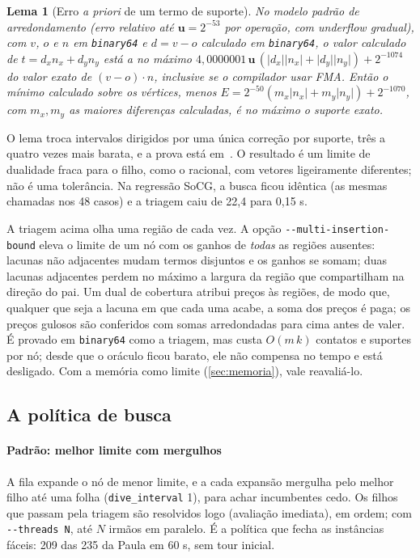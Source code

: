 \documentclass[11pt,a4paper]{article}
\theoremstyle{plain}\newtheorem{proposicao}{Proposição}
\theoremstyle{definition}\newtheorem{definicao}{Definição}
\theoremstyle{plain}\newtheorem{teorema}{Teorema}
\theoremstyle{plain}\newtheorem{lema}{Lema}
\newcommand{\abs}[1]{\lvert#1\rvert}
\newcommand{\code}[1]{\texttt{\small #1}}
\begin{document}
\begin{lema}[Erro \emph{a priori} de um termo de suporte]\label{lem:apriori}
No modelo padrão de arredondamento (erro relativo até \(\mathbf u=2^{-53}\) por operação, com \emph{underflow} gradual), com \(v\), \(o\) e \(n\) em \texttt{binary64} e \(d=v-o\) calculado em \texttt{binary64}, o valor calculado de \(t=d_x n_x+d_y n_y\) está a no máximo \(4{,}0000001\,\mathbf u\,(\abs{d_x}\abs{n_x}+\abs{d_y}\abs{n_y})+2^{-1074}\) do valor exato de \((v-o)\cdot n\), inclusive se o compilador usar FMA. Então o mínimo calculado sobre os vértices, menos \(E=2^{-50}(m_x\abs{n_x}+m_y\abs{n_y})+2^{-1070}\), com \(m_x,m_y\) as maiores diferenças calculadas, é no máximo o suporte exato.
\end{lema}
O lema troca intervalos dirigidos por uma única correção por suporte, três a quatro vezes mais barata, e a prova está em~\cite{ordemlivre}. O resultado é um limite de dualidade fraca para o filho, como o racional, com vetores ligeiramente diferentes; não é uma tolerância. Na regressão SoCG, a busca ficou idêntica (as mesmas chamadas nos 48 casos) e a triagem caiu de 22,4 para 0,15 s.

\begin{ideia}
A triagem acima olha uma região de cada vez. A opção \code{-{}-multi-insertion-bound} eleva o limite de um nó com os ganhos de \emph{todas} as regiões ausentes: lacunas não adjacentes mudam termos disjuntos e os ganhos se somam; duas lacunas adjacentes perdem no máximo a largura da região que compartilham na direção do pai. Um dual de cobertura atribui preços às regiões, de modo que, qualquer que seja a lacuna em que cada uma acabe, a soma dos preços é paga; os preços gulosos são conferidos com somas arredondadas para cima antes de valer. É provado em \texttt{binary64} como a triagem, mas custa \(O(m\,k)\) contatos e suportes por nó; desde que o oráculo ficou barato, ele não compensa no tempo e está desligado. Com a memória como limite (\cref{sec:memoria}), vale reavaliá-lo.
\end{ideia}

\subsection{A política de busca}\label{sec:politica}
\paragraph{Padrão: melhor limite com mergulhos} A fila expande o nó de menor limite, e a cada expansão mergulha pelo melhor filho até uma folha (\code{dive\_interval} 1), para achar incumbentes cedo. Os filhos que passam pela triagem são resolvidos logo (avaliação imediata), em ordem; com \code{-{}-threads N}, até \(N\) irmãos em paralelo. É a política que fecha as instâncias fáceis: 209 das 235 da Paula em 60 s, sem tour inicial.
\end{document}
